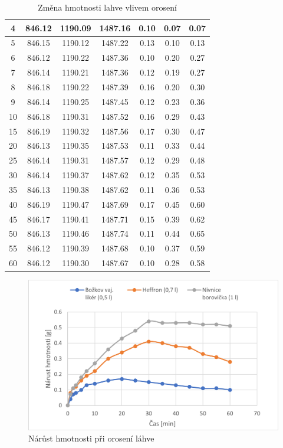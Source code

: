 \begin{table}[H]
\begin{tabular}{|c|c|c|c||c|c|c|}
    4  & 846.12 & 1190.09 & 1487.16 & 0.10 & 0.07 & 0.07 \\ \hline
    5  & 846.15 & 1190.12 & 1487.22 & 0.13 & 0.10 & 0.13 \\ \hline
    6  & 846.12 & 1190.22 & 1487.36 & 0.10 & 0.20 & 0.27 \\ \hline
    7  & 846.14 & 1190.21 & 1487.36 & 0.12 & 0.19 & 0.27 \\ \hline
    8  & 846.18 & 1190.22 & 1487.39 & 0.16 & 0.20 & 0.30 \\ \hline
    9  & 846.14 & 1190.25 & 1487.45 & 0.12 & 0.23 & 0.36 \\ \hline
    10 & 846.18 & 1190.31 & 1487.52 & 0.16 & 0.29 & 0.43 \\ \hline
    15 & 846.19 & 1190.32 & 1487.56 & 0.17 & 0.30 & 0.47 \\ \hline
    20 & 846.13 & 1190.35 & 1487.53 & 0.11 & 0.33 & 0.44 \\ \hline
    25 & 846.14 & 1190.31 & 1487.57 & 0.12 & 0.29 & 0.48 \\ \hline
    30 & 846.14 & 1190.37 & 1487.62 & 0.12 & 0.35 & 0.53 \\ \hline
    35 & 846.13 & 1190.38 & 1487.62 & 0.11 & 0.36 & 0.53 \\ \hline
    40 & 846.19 & 1190.47 & 1487.69 & 0.17 & 0.45 & 0.60 \\ \hline
    45 & 846.17 & 1190.41 & 1487.71 & 0.15 & 0.39 & 0.62 \\ \hline
    50 & 846.13 & 1190.46 & 1487.74 & 0.11 & 0.44 & 0.65 \\ \hline
    55 & 846.12 & 1190.39 & 1487.68 & 0.10 & 0.37 & 0.59 \\ \hline
    60 & 846.12 & 1190.30 & 1487.67 & 0.10 & 0.28 & 0.58 \\ \hline
    \end{tabular}
    \caption{Změna hmotnosti lahve vlivem orosení}
    \label{tab:measurement_data}
\end{table}

\begin{figure}[H]
    \begin{center}
        \includegraphics[scale=1.2]{obrazky/orosení.png}
    \end{center}
    \caption{Nárůst hmotnosti při orosení láhve}
\end{figure}

